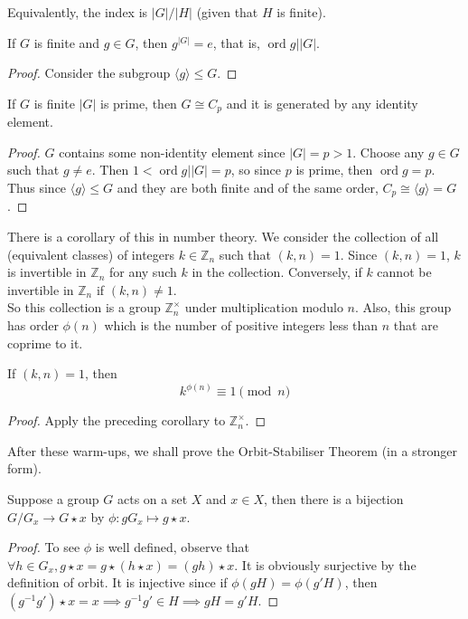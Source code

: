 Equivalently, the index is $|G|/|H|$ (given that $H$ is finite).
\begin{corollary}
    If $G$ is finite and $g\in G$, then $g^{|G|}=e$, that is, $\operatorname{ord}g||G|$.
\end{corollary}
\begin{proof}
    Consider the subgroup $\langle g\rangle\le G$.
\end{proof}
\begin{corollary}
    If $G$ is finite $|G|$ is prime, then $G\cong C_p$ and it is generated by any identity element.
\end{corollary}
\begin{proof}
    $G$ contains some non-identity element since $|G|=p>1$.
    Choose any $g\in G$ such that $g\neq e$.
    Then $1<\operatorname{ord}g||G|=p$, so since $p$ is prime, then $\operatorname{ord}g=p$.
    Thus since $\langle g\rangle\le G$ and they are both finite and of the same order, $C_p\cong \langle g\rangle=G$.
\end{proof}
There is a corollary of this in number theory.
We consider the collection of all (equivalent classes) of integers $k\in\mathbb Z_n$ such that $(k,n)=1$.
Since $(k,n)=1$, $k$ is invertible in $\mathbb Z_n$ for any such $k$ in the collection.
Conversely, if $k$ cannot be invertible in $\mathbb Z_n$ if $(k,n)\neq 1$.\\
So this collection is a group $\mathbb Z_n^{\times}$ under multiplication modulo $n$.
Also, this group has order $\phi(n)$ which is the number of positive integers less than $n$ that are coprime to it.
\begin{corollary}
    If $(k,n)=1$, then
    $$k^{\phi(n)}\equiv 1\pmod{n}$$
\end{corollary}
\begin{proof}
    Apply the preceding corollary to $\mathbb Z_n^\times$.
\end{proof}
After these warm-ups, we shall prove the Orbit-Stabiliser Theorem (in a stronger form).
\begin{theorem}
    Suppose a group $G$ acts on a set $X$ and $x\in X$, then there is a bijection $G/G_x\to G\star x$ by $\phi:gG_x\mapsto g\star x$.
\end{theorem}
\begin{proof}
    To see $\phi$ is well defined, observe that $\forall h\in G_x, g\star x=g\star (h\star x)=(gh)\star x$.
    It is obviously surjective by the definition of orbit.
    It is injective since if $\phi(gH)=\phi(g'H)$, then $(g^{-1}g')\star x=x\implies g^{-1}g'\in H\implies gH=g'H$.
\end{proof}
